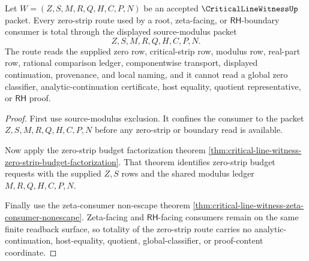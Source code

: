 \begin{theorem}
\label{thm:criticallinewitness-zero-strip-route-totality}
Let $W=(Z,S,M,R,Q,H,C,P,N)$ be an accepted $\CriticalLineWitnessUp$ packet. Every zero-strip route used by a root, zeta-facing, or $\mathsf{RH}$-boundary consumer is total through the displayed source-modulus packet
$$
Z,S,M,R,Q,H,C,P,N.
$$
The route reads the supplied zero row, critical-strip row, modulus row, real-part row, rational comparison ledger, componentwise transport, displayed continuation, provenance, and local naming, and it cannot read a global zero classifier, analytic-continuation certificate, host equality, quotient representative, or $\mathsf{RH}$ proof.
\end{theorem}
\begin{proof}
First use source-modulus exclusion. It confines the consumer to the packet $Z,S,M,R,Q,H,C,P,N$ before any zero-strip or boundary read is available.

Now apply the zero-strip budget factorization theorem \autoref{thm:critical-line-witness-zero-strip-budget-factorization}. That theorem identifies zero-strip budget requests with the supplied $Z,S$ rows and the shared modulus ledger $M,R,Q,H,C,P,N$.

Finally use the zeta-consumer non-escape theorem \autoref{thm:critical-line-witness-zeta-consumer-nonescape}. Zeta-facing and $\mathsf{RH}$-facing consumers remain on the same finite readback surface, so totality of the zero-strip route carries no analytic-continuation, host-equality, quotient, global-classifier, or proof-content coordinate.
\end{proof}

